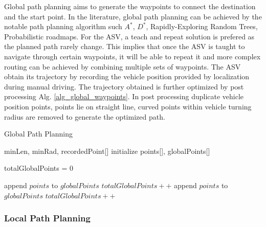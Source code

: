 \documentclass[10 pt,a4paper,conference]{IEEEtran}
\begin{document}
Global path planning aims to generate the waypoints to connect the
destination and the start point. In the literature, global path planning
can be achieved by the notable path planning algorithm such
$A^{*}$\citep{hart1968formal}, $D^{*}$\citep{stentz1994optimal},
Rapidly-Exploring Random Trees\citep{lavalle1998rapidly}, Probabilistic
roadmaps\citep{kavraki1996probabilistic}. For the ASV, a teach and
repeat solution is prefered as the planned path rarely change. This
implies that once the ASV is taught to navigate through certain
waypoints, it will be able to repeat it and more complex routing can be
achieved by combining multiple sets of waypoints. The ASV obtain its
trajectory by recording the vehicle position provided by localization
during manual driving. The trajectory obtained is further optimized by
post processing Alg. \ref{alg_global_waypoints}. In post processing
duplicate vehicle position points, points lie on straight line, curved
points within vehicle turning radius are removed to generate the
optimized path.

\begin{algorithm}
      \scriptsize
      \caption{Global Path Planning}
      \label{alg_global_waypoints}
      \begin{algorithmic}[1]
          \REQUIRE minLen, minRad, recordedPoint[] 
            \STATE initialize points[], globalPoints[] 

            \STATE totalGlobalPoints = 0
            
                    \STATE append $points$ to $globalPoints$
                    \STATE $totalGlobalPoints++$
                \ELSE
                        \STATE append $points$ to $globalPoints$
                        \STATE $totalGlobalPoints++$
                    \ENDIF
                \ENDIF
            \ENDFOR
      \end{algorithmic}
\end{algorithm}

\subsubsection{Local Path Planning}\label{local-path-planning}
\end{document}
